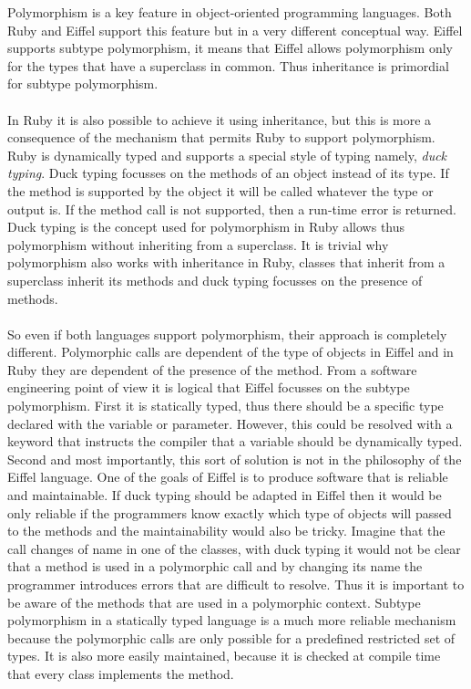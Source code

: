 \documentclass[11pt,a4paper,twocolumn]{article}
\begin{document}
Polymorphism is a key feature in object-oriented programming languages. Both Ruby and Eiffel support this feature but in a very different conceptual way. Eiffel supports subtype polymorphism, it means that Eiffel allows polymorphism only for the types that have a superclass in common. Thus inheritance is primordial for  subtype polymorphism. 
\\
\\ 
In Ruby it is also possible to achieve it using inheritance, but this is more a consequence of the mechanism that permits Ruby to support polymorphism. Ruby is dynamically typed and supports a special style of typing namely, \emph{duck typing}. Duck typing focusses on the methods of an object instead of its type. If the method is supported by the object it will be called whatever the type or output is. If the method call is not supported, then a run-time error is returned. Duck typing is the concept used for polymorphism in Ruby allows thus polymorphism without inheriting from a superclass. It is trivial why polymorphism also works with inheritance in Ruby, classes that inherit from a superclass inherit its methods and duck typing focusses on the presence of methods.
\\
\\
So even if both languages support polymorphism, their approach is completely different. Polymorphic calls are dependent of the type of objects in Eiffel and in Ruby they are dependent of the presence of the method. From a software engineering point of view it is logical that Eiffel focusses on the subtype polymorphism. First it is statically typed, thus there should be a specific type declared with the variable or parameter. However, this could be resolved with a keyword that instructs the compiler that a variable should be dynamically typed. Second and most importantly, this sort of solution is not in the philosophy of the Eiffel language.  One of the goals of Eiffel is to produce software that is reliable and maintainable. If duck typing should be adapted in Eiffel then it would be only reliable if the programmers know exactly which type of objects will passed to the methods and the maintainability would also be tricky. Imagine that the call changes of name in one of the classes, with duck typing it would not be clear that a method is used in a polymorphic call and by changing its name the programmer introduces errors that are difficult to resolve. Thus it is important to be aware of the methods that are used in a polymorphic context. Subtype polymorphism in a statically typed language is a much more reliable mechanism because the polymorphic calls are only possible for a predefined restricted set of types. It is also more easily maintained, because it is checked at compile time that every class implements the method.
\end{document}
